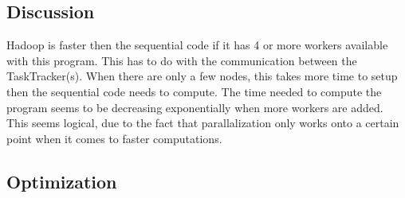 \documentclass[a4paper]{article}
\begin{document}
  \subsection{Discussion}
    Hadoop is faster then the sequential code if it has 4 or more workers
    available with this program. This has to do with the communication
    between the TaskTracker(s). When there are only a few nodes,
    this takes more time to setup then the sequential code needs to compute.
    The time needed to compute the program seems to be decreasing exponentially
    when more workers are added. This seems logical, due to the fact that
    parallalization only works onto a certain point when it comes to faster
    computations.
  \subsection{Optimization}
  
\end{document}
